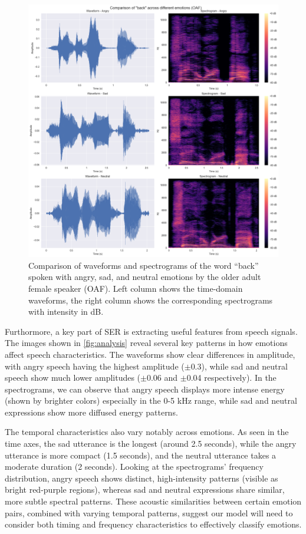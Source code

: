 \documentclass[../main.tex]{subfiles}
\begin{document}
\begin{figure}[ht]
    \centering
    \includegraphics[width= 350pt]{../resources/tess_analysis.png}
    \caption{Comparison of waveforms and spectrograms of the word 
    ``back'' spoken with angry, sad, and neutral emotions by the older adult 
    female speaker (OAF). Left column shows the time-domain waveforms, the 
    right column shows the corresponding spectrograms with intensity in dB.}
    \label{fig:analysis}
\end{figure}

Furthormore, a key part of SER is extracting useful features from speech signals. 
The images shown in \autoref{fig:analysis} reveal several key patterns in how emotions 
affect speech characteristics. The waveforms show clear differences in amplitude, with
angry speech having the highest amplitude ($\pm$0.3), while sad and neutral speech
show much lower amplitudes ($\pm$0.06 and $\pm$0.04 respectively). In the spectrograms,
we can observe that angry speech displays more intense energy
(shown by brighter colors) especially in the 0-5 kHz range, while sad and
neutral expressions show more diffused energy patterns.

The temporal characteristics also vary notably across emotions. As seen in the
time axes, the sad utterance is the longest (around 2.5 seconds), while the
angry utterance is more compact (1.5 seconds), and the neutral utterance takes
a moderate duration (2 seconds). Looking at the spectrograms' frequency
distribution, angry speech shows distinct, high-intensity patterns
(visible as bright red-purple regions), whereas sad and neutral expressions
share similar, more subtle spectral patterns. These acoustic similarities
between certain emotion pairs, combined with varying temporal patterns,
suggest our model will need to consider both timing and frequency
characteristics to effectively classify emotions.
\end{document}
